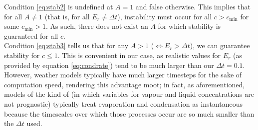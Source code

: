 \documentclass[11pt]{article}
\begin{document}
Condition \ref{eq:stab2} is undefined at $A=1$ and false otherwise. This implies that for all $A\neq 1$ (that is, for all $E_r\neq\Delta t$), instability must occur for all $c>c_{\text{min}}$ for some $c_{\text{min}}>1$. As such, there does not exist an $A$ for which stability is guaranteed for all $c$. \\
Condition \ref{eq:stab3} tells us that for any $A>1$ ($\Leftrightarrow E_r>\Delta t$), we can guarantee stability for $c\leq 1$. This is convenient in our case, as realistic values for $E_r$ (as provided by equation \ref{eq:condrate}) tend to be much larger than our $\Delta t=0.1$. However, weather models typically have much larger timesteps for the sake of computation speed, rendering this advantage moot; in fact, as aforementioned, models of the kind of \citet{Smith1990} (in which variables for vapour and liquid concentrations are not prognostic) typically treat evaporation and condensation as instantaneous because the timescales over which those processes occur are so much smaller than the $\Delta t$ used.
\end{document}
